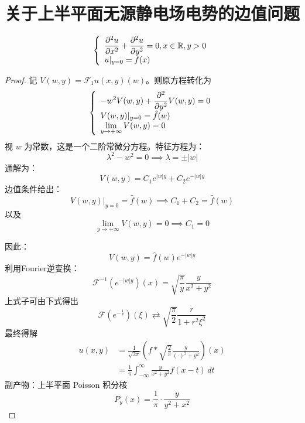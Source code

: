\documentclass[linespread=1.5,openany]{book}%
\theoremstyle{plain}
\begin{document}
{{{					\section{关于上半平面无源静电场电势的边值问题}
					\[\left\{\begin{array}{l}
						\Large \displaystyle \frac{\partial^2 u}{\partial x^2} + \frac{\partial^2 u}{\partial y^2} = 0,  x \in \mathbb{R}, y > 0\\
						\Large \displaystyle 		u|_{y=0} = f(x) \\	
					\end{array}\right.\]
					\begin{proof}
						记 $V(w, y) = \mathcal{F}_1 u(x, y)(w)$。则原方程转化为
						\[\left\{\begin{array}{l}
							\Large \displaystyle - w^2 V(w, y) +  \frac{\partial^2}{\partial y^2}V(w, y) = 0 \\
							\Large \displaystyle 			V(w, y)|_{y=0} = \hat{f}(w) \\
							\Large \displaystyle	\lim_{y \to +\infty} V(w, y) = 0  
						\end{array}\right.\]
						视 $w$ 为常数，这是一个二阶常微分方程。特征方程为：
						\[
						\lambda^2 - w^2 = 0 \implies \lambda = \pm |w|
						\]
						通解为：
						\[
						V(w, y) = C_1 e^{|w| y} + C_2 e^{-|w| y}
						\]边值条件给出：
						\[
						V(w, y)|_{y=0} = \hat{f}(w) \implies C_1 + C_2 = \hat{f}(w)
						\]
						以及
						\[
						\lim_{y \to +\infty} V(w, y) = 0 \implies C_1 = 0
						\]
						
						因此：
						\[
						V(w, y) = \hat{f}(w) e^{-|w| y}
						\]
						利用Fourier逆变换：
						\[	\mathcal{F}^{-1}\left(e^{-|w| y}\right)(x) = \sqrt{\dfrac{\pi}{y}} \dfrac{y}{x^2 + y^2}
						\]
						上式子可由下式得出
						\[
						\mathcal{F}\left(e^{-\frac{1}{r}}\right)(\xi) \rightleftarrows \sqrt{\dfrac{\pi}{2}} \dfrac{r}{1 + r^2 \xi^2}
						\]最终得解
						\begin{equation}
							\begin{aligned}
								u(x, y) &= \frac{1}{\sqrt{2 \pi}}\left(f * \sqrt{\frac{2}{\pi}} \frac{y}{(\cdot)^{2} + y^{2}}\right)(x) \\
								&= \frac{1}{\pi} \int_{-\infty}^{\infty} \frac{y}{x^{2} + y^{2}} f(x - t) \, dt
							\end{aligned}
						\end{equation}
						副产物：上半平面 Poisson 积分核
						\begin{equation}
							P_y(x) = \dfrac{1}{\pi} \cdot \dfrac{y}{y^2 + x^2}
						\end{equation}	
					\end{proof}
					
}}}
\end{document}

